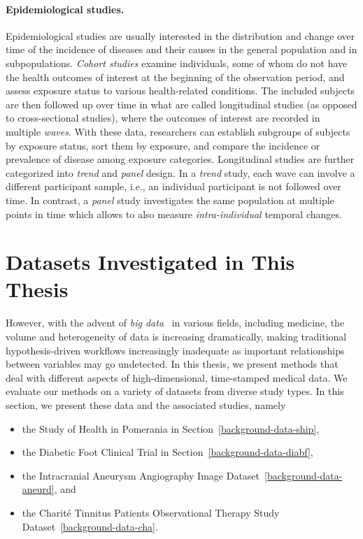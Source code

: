 \documentclass[
  oneside]{book}
\providecommand{\tightlist}{%
  \setlength{\itemsep}{0pt}\setlength{\parskip}{0pt}}
\begin{document}
\paragraph*{Epidemiological studies.}

Epidemiological studies are usually interested in the distribution and change over time of the incidence of diseases and their causes in the general population and in subpopulations.
\emph{Cohort studies} examine individuals, some of whom do not have the health outcomes of interest at the beginning of the observation period, and assess exposure status to various health-related conditions.
The included subjects are then followed up over time in what are called longitudinal studies (as opposed to cross-sectional studies), where the outcomes of interest are recorded in multiple \emph{waves}.
With these data, researchers can establish subgroups of subjects by exposure status, sort them by exposure, and compare the incidence or prevalence of disease among exposure categories.
Longitudinal studies are further categorized into \emph{trend} and \emph{panel} design.
In a \emph{trend} study, each wave can involve a different participant sample, i.e., an individual participant is not followed over time.
In contrast, a \emph{panel} study investigates the same population at multiple points in time which allows to also measure \emph{intra-individual} temporal changes.

\hypertarget{background-data}{%
\section{Datasets Investigated in This Thesis}\label{background-data}}

However, with the advent of \emph{big data}~\autocite{oussous2018big} in various fields, including medicine, the volume and heterogeneity of data is increasing dramatically, making traditional hypothesis-driven workflows increasingly inadequate as important relationships between variables may go undetected.
In this thesis, we present methods that deal with different aspects of high-dimensional, time-stamped medical data.
We evaluate our methods on a variety of datasets from diverse study types.
In this section, we present these data and the associated studies, namely

\begin{itemize}
\tightlist
\item
  the Study of Health in Pomerania in Section~\ref{background-data-ship},
\item
  the Diabetic Foot Clinical Trial in Section~\ref{background-data-diabf},
\item
  the Intracranial Aneurysm Angiography Image Dataset~\ref{background-data-aneurd}, and
\item
  the Charité Tinnitus Patients Observational Therapy Study Dataset~\ref{background-data-cha}.
\end{itemize}
\end{document}
